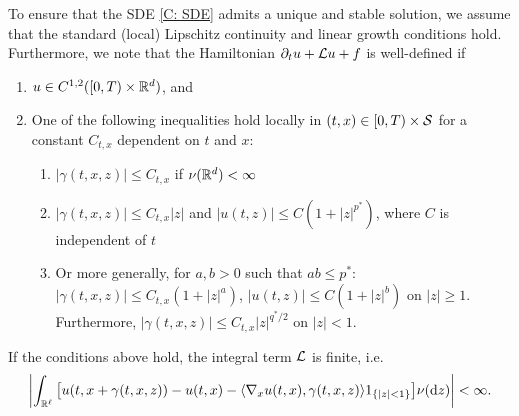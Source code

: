 To ensure that the SDE \eqref{C: SDE} admits a unique and stable solution, we assume that the standard (local) Lipschitz continuity and linear growth conditions hold. Furthermore, we note that the Hamiltonian $\partial_t u + \mathcal{L} u + f$ is well-defined if 
\begin{enumerate}
    \item $u \in C^{1,2}([0,T) \times \mathbb{R}^d)$, and
    \item One of the following inequalities hold locally in $(t,x) \in [0,T) \times \mathcal{S}$ for a constant $C_{t,x}$ dependent on $t$ and $x$:
    \begin{enumerate}[label=(\alph*), ref=(\alph*)]
        \item $|\gamma(t,x,z)| \leq C_{t,x}$ if $\nu(\mathbb{R}^d) < \infty$ \label{C: (a)}
        \item $|\gamma(t,x,z)| \leq C_{t,x}|z|$ and $|u(t,z)| \leq C(1+|z|^{p^*})$, where $C$ is independent of $t$ \label{C: (b)}
        \item Or more generally, for $a,b>0$ such that $ab \leq p^*$: $|\gamma(t,x,z)| \leq C_{t,x}(1+|z|^a)$, $|u(t,z)| \leq C(1+|z|^b)$ on $|z|\geq1$. Furthermore, $|\gamma(t,x,z)| \leq C_{t,x} |z|^{q^*/2}$ on $|z|<1$. \label{C: (c)}
    \end{enumerate}
\end{enumerate}
If the conditions above hold, the integral term $\mathcal{L}$ is finite, i.e.
\begin{equation*}
    \left| \int_{\mathbb{R}^\ell} \big[ u(t,x+\gamma(t,x,z)) - u(t,x) - \langle \nabla_x u(t,x), \gamma(t,x,z) \rangle 1_{\left\{|z|<1\right\}} \big] \nu(\mathrm{d} z) \right| < \infty.
\end{equation*}

